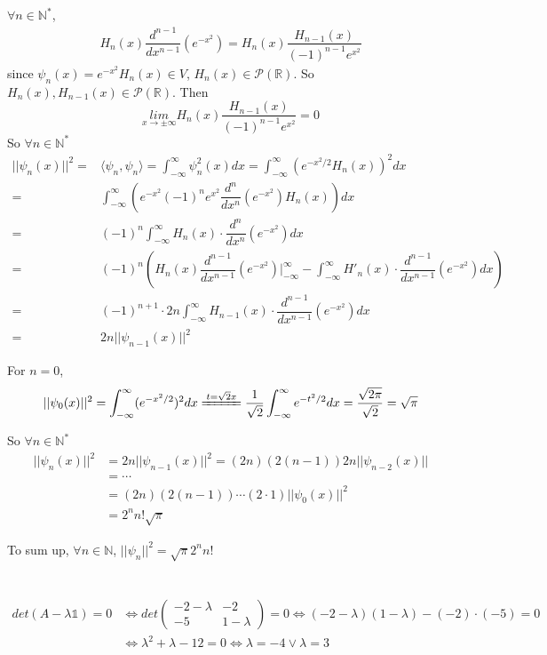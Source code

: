 \documentclass[a4paper,12pt,titlepage]{article}
\begin{document}
\subsection{}
$\forall n\in\mathbb{N}^*$,
\begin{align*}
H_n(x)\dfrac{d^{n-1}}{dx^{n-1}}(e^{-x^2})=H_n(x)\dfrac{H_{n-1}(x)}{(-1)^{n-1}e^{x^2}}
\end{align*}
since $\psi_n(x)=e^{-x^2}H_n(x)\in V$, $H_n(x)\in\mathcal{P}(\mathbb{R})$. So $H_n(x),H_{n-1}(x)\in\mathcal{P}(\mathbb{R})$. Then
$$\underset{x\rightarrow\pm\infty}{lim}H_n(x)\dfrac{H_{n-1}(x)}{(-1)^{n-1}e^{x^2}}=0$$
So $\forall n\in\mathbb{N}^*$
\begin{align*}
||\psi_n(x)||^2=&\langle \psi_n,\psi_n\rangle=\int_{-\infty}^{\infty}\psi^2_n(x)dx=\int_{-\infty}^{\infty}(e^{-x^2/2}H_n(x))^2dx\\
=&\int_{-\infty}^{\infty}(e^{-x^2}(-1)^{n} e^{x^2}\dfrac{d^{n}}{dx^{n}}(e^{-x^2})H_n(x))dx\\
=&(-1)^{n}\int_{-\infty}^{\infty}H_n(x)\cdot\dfrac{d^{n}}{dx^{n}}(e^{-x^2})dx\\
=&(-1)^{n}(H_n(x)\dfrac{d^{n-1}}{dx^{n-1}}(e^{-x^2})\Big|_{-\infty}^{\infty}-\int_{-\infty}^{\infty}H'_n(x)\cdot\dfrac{d^{n-1}}{dx^{n-1}}(e^{-x^2})dx)\\
=&(-1)^{n+1}\cdot 2n\int_{-\infty}^{\infty}H_{n-1}(x)\cdot\dfrac{d^{n-1}}{dx^{n-1}}(e^{-x^2})dx\\
=&2n||\psi_{n-1}(x)||^2
\end{align*}

For $n=0$,
\begin{align*}
||\psi_0(x)||^2=\int_{-\infty}^{\infty}(e^{-x^2/2} )^2dx
\xlongequal{t=\sqrt{2}x}\dfrac{1}{\sqrt{2}}\int_{-\infty}^{\infty}e^{-t^2/2} dx=\dfrac{\sqrt{2\pi}}{\sqrt{2}}=\sqrt{\pi}
\end{align*}

So $\forall n\in \mathbb{N}^*$
\begin{align*}
||\psi_n(x)||^2&=2n||\psi_{n-1}(x)||^2=(2n)(2(n-1))2n||\psi_{n-2}(x)||\\
&=\cdots\\
&=(2n)(2(n-1))\cdots(2\cdot1)||\psi_{0}(x)||^2\\
&=2^nn!\sqrt{\pi}
\end{align*}

To sum up, $\forall n\in\mathbb{N}$, $||\psi_n||^2=\sqrt{\pi}2^nn!$
\section{}
\subsection{}
\begin{align*}
det(A-\lambda\mathds{1})=0&\Leftrightarrow det\begin{pmatrix}
-2-\lambda&-2\\-5&1-\lambda\end{pmatrix}=0\Leftrightarrow (-2-\lambda)(1-\lambda)-(-2)\cdot (-5)=0\\
&\Leftrightarrow\lambda^2+\lambda-12=0\Leftrightarrow\lambda=-4\vee\lambda=3
\end{align*}
\end{document}
